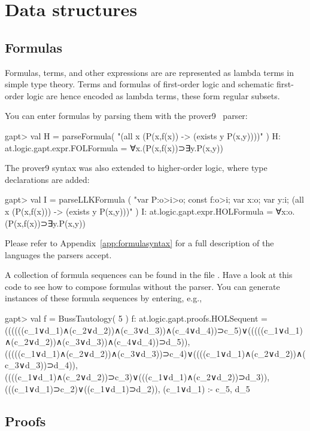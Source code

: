 \documentclass[a4paper,11pt]{article}
\newcommand{\cli}[1]{{\ttfamily {#1}}}
\begin{document}
\section{Data structures}

\subsection{Formulas}

Formulas, terms, and other expressions are are represented as lambda terms in
simple type theory.  Terms and formulas of first-order logic and schematic
first-order logic are hence encoded as lambda terms, these form regular
subsets.

You can enter formulas by parsing them with the prover9~\cite{Prover9Input} parser:
%
\begin{clilisting}
gapt> val H = parseFormula( "(all x (P(x,f(x)) -> (exists y P(x,y))))" )
H: at.logic.gapt.expr.FOLFormula = ∀x.(P(x,f(x))⊃∃y.P(x,y))

\end{clilisting}
%
The prover9 syntax was also extended to higher-order logic, where type declarations are added:
%
\begin{clilisting}
gapt> val I = parseLLKFormula ( "var P:o>i>o; const f:o>i; var x:o; var y:i; (all x (P(x,f(x))) -> (exists y P(x,y)))" )
I: at.logic.gapt.expr.HOLFormula = ∀x:o.(P(x,f(x))⊃∃y.P(x,y))

\end{clilisting}

Please refer to Appendix~\ref{app:formulasyntax} for a full description of the languages the parsers accept.

A collection of formula sequences can be found in the file \cli{examples/FormulaSequences.scala}.
Have a look at this code to see how to compose formulas without the parser.
You can generate instances of these formula sequences by entering, e.g.,
%
\begin{clilisting}
gapt> val f = BussTautology( 5 )
f: at.logic.gapt.proofs.HOLSequent = ((((((c_1∨d_1)∧(c_2∨d_2))∧(c_3∨d_3))∧(c_4∨d_4))⊃c_5)∨(((((c_1∨d_1)∧(c_2∨d_2))∧(c_3∨d_3))∧(c_4∨d_4))⊃d_5)), (((((c_1∨d_1)∧(c_2∨d_2))∧(c_3∨d_3))⊃c_4)∨((((c_1∨d_1)∧(c_2∨d_2))∧(c_3∨d_3))⊃d_4)), ((((c_1∨d_1)∧(c_2∨d_2))⊃c_3)∨(((c_1∨d_1)∧(c_2∨d_2))⊃d_3)), (((c_1∨d_1)⊃c_2)∨((c_1∨d_1)⊃d_2)), (c_1∨d_1) :- c_5, d_5

\end{clilisting}

\subsection{Proofs}\label{sec:entering_proofs}
\end{document}
